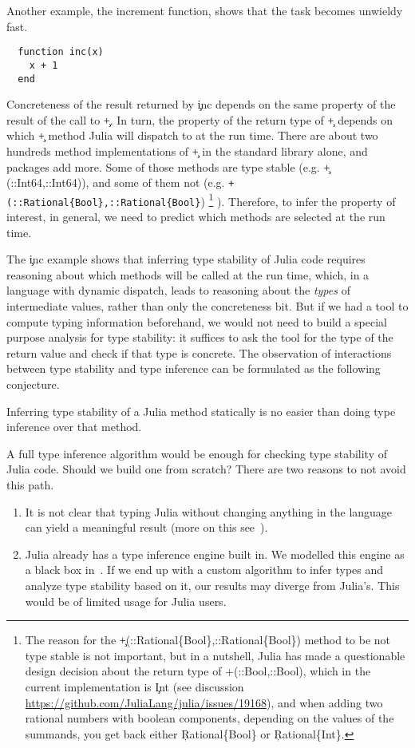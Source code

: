 Another example, the increment function, shows that the task becomes unwieldy fast.
%
\begin{lstlisting}
  function inc(x)
    x + 1
  end
\end{lstlisting}
%
Concreteness of the result returned by \c{inc} depends on the same property of
the result of the call to \c{+}. In turn, the property of the return type of
\c{+} depends on which \c{+} method Julia will dispatch to at the run time.
There are about two hundreds method implementations of \c{+} in the standard
library alone, and packages add more. Some of those methods are type stable
(e.g. \c{+(::Int64,::Int64)}), and some of them not (e.g.
\lstinline|+(::Rational{Bool},::Rational{Bool}|)
\footnote{%
  The reason for the
  \c{+(::Rational\{Bool\},::Rational\{Bool\})} method to be not type
  stable is not important, but in a nutshell, Julia has made a questionable
  design decision about the return type of \c{{+}(::Bool,::Bool)}, which in the
  current implementation is \c{Int}
  (see discussion \url{https://github.com/JuliaLang/julia/issues/19168}),
  and when adding two rational numbers with boolean components, depending on the
  values of the summands, you get back either \c{Rational\{Bool\}} or
  \c{Rational\{Int\}}.}
).
Therefore,
to infer the property of interest, in general,
we need to predict which methods are selected at the run time.

The \c{inc} example shows that inferring type stability of Julia code
requires
reasoning about which methods will be called at the run time, which, in a
language with dynamic dispatch, leads
to reasoning about the \emph{types} of intermediate values, rather than only
the concreteness bit. But if we had a tool to compute typing information
beforehand, we would not need to build a special purpose analysis for type
stability: it suffices to ask the tool for the type of the return value and
check if that type is concrete. The observation of interactions between type
stability and type inference can be formulated as the following conjecture.

\begin{conjecture}
  Inferring type stability of a Julia method statically is no easier than doing type
  inference over that method.
\end{conjecture}

A full type inference algorithm would be enough for checking type stability of
Julia code. Should we build one from scratch? There are two reasons to not
avoid this path.
\begin{enumerate}

  \item It is not clear that typing Julia without changing anything in the
  language can yield a meaningful result (more on this
  see~\cite{Chung23}).

  \item Julia already has a type inference engine built in. We modelled this
        engine as a black box in~. If we end up with a
        custom algorithm to infer types and analyze type stability based on it,
        our results may diverge from Julia's. This would be of limited usage for
        Julia users.
\end{enumerate}

